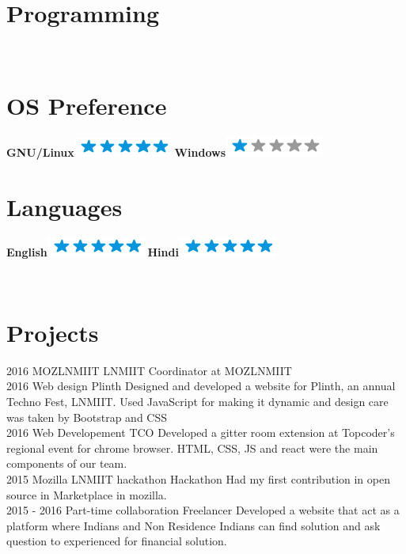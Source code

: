 \documentclass[]{friggeri-cv}
\begin{document}
\begin{aside}
  \section{Programming}
    ~
  \section{OS Preference}
    \textbf{GNU/Linux}\includegraphics[scale=0.40]{img/5stars.png}
    \textbf{Windows}\includegraphics[scale=0.40]{img/1stars.png}
    ~
  \section{Languages}
    \textbf{English}\includegraphics[scale=0.40]{img/5stars.png}
    \textbf{Hindi}\includegraphics[scale=0.40]{img/5stars.png}
    ~
\end{aside}
~
\section{ Projects}
\begin{entrylist}
\entry
    {2016}
    {MOZLNMIIT}
    {LNMIIT}
    {Coordinator at MOZLNMIIT \\}
  \entry
    {2016}
    {Web design}
    {Plinth}
    {Designed and developed a website for Plinth, an annual Techno Fest, LNMIIT. Used JavaScript for making it dynamic and design care was taken by Bootstrap and CSS \\}
  \entry
    {2016}
    {Web Developement}
    {TCO}
    {Developed a gitter room extension at Topcoder's regional event for chrome browser. HTML, CSS, JS and react were the main components of our team. \\}
    \entry
    {2015}
    {Mozilla LNMIIT hackathon}
    {Hackathon}
    {Had my first contribution in open source in Marketplace in mozilla. \\}
    \entry
    {2015 - 2016}
    {Part-time collaboration}
    {Freelancer}
    {Developed a website that act as a platform where Indians and Non Residence Indians can find solution and ask question to experienced for financial solution. \\}
\end{entrylist}
\\
\end{document}
